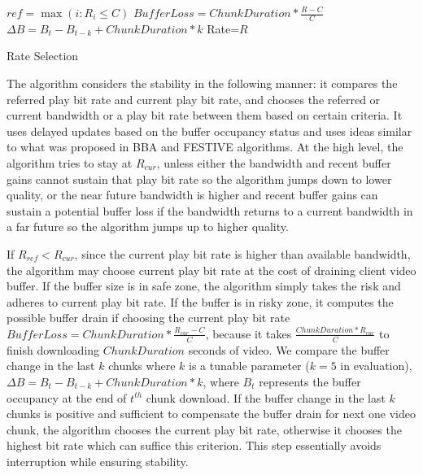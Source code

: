 \begin{algorithm} [t]
\SetAlgoLined
${ref} = \max ({i: R_i \le C})$\;
 {
 {
 $BufferLoss=ChunkDuration*\frac{R-C}{C}$\;
 $\Delta B = B_{t} -B_{t-k} +ChunkDuration*k$\;
 \uIf{$\Delta B>BLoss$}
 {Rate=$R$}
 }
 }
\caption{Rate Selection} \label{cap:algorithm}
\end{algorithm} 

The algorithm considers the stability in the following manner: it
compares the referred play bit rate and current play bit rate, and
chooses the referred or current bandwidth or a play bit rate
between them based on  certain criteria. It uses delayed updates
based on the buffer occupancy status and uses ideas similar to what
was proposed in BBA \cite{BBA} and FESTIVE \cite{Festive} algorithms. 
At the high level, the algorithm tries to stay at $R_{cur}$, 
unless either the bandwidth and recent buffer gains cannot sustain 
that play bit rate so the algorithm jumps down to lower quality, 
or the near future bandwidth is higher and recent buffer gains can sustain a 
potential buffer loss if the bandwidth returns to a current bandwidth in a far future so the algorithm jumps up to higher quality.

If $R_{ref} < R_{cur}$, since the current play bit rate is higher than available bandwidth, the
algorithm may choose current play bit rate at the cost of draining
client video buffer. If the buffer size is in safe zone, the
algorithm simply takes the risk and adheres to current play bit rate. If the
buffer is in risky zone, it computes the possible buffer drain if
choosing the current play bit rate $BufferLoss
=ChunkDuration*\frac{R_{cur}-C}{C}$, because it takes $\frac{ChunkDuration*R_{cur}}{C}$ to finish downloading 
$ChunkDuration$ seconds of video. 
We compare the buffer change in
the last $k$ chunks where $k$ is a tunable parameter ($k=5$ in evaluation), 
$\Delta B = B_{t} -B_{t-k} + ChunkDuration*k$, where $B_{t}$
represents the buffer occupancy at the end of $t^{th}$ chunk
download. If the buffer change in the last $k$ chunks is positive and
sufficient to compensate the buffer drain for next one video chunk, the
algorithm chooses the current play bit rate, otherwise it chooses the
highest bit rate which can suffice this criterion. This step
essentially avoids interruption while ensuring stability. 

